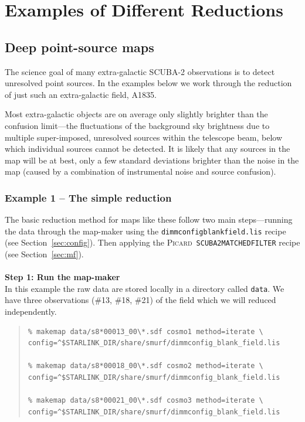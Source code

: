 \documentclass[twoside,11pt]{article}
\newcommand{\htmlref}[2]{#1}
\newcommand{\latexhtml}[2]{#1}
\newcommand{\xref}[3]{#1}
\newcommand{\xlabel}[1]{}
\renewcommand{\_}{\texttt{\symbol{95}}}
\newenvironment{myquote}{
   \color{MidnightBlue}\begin{quote}\begin{small}}{
   \end{small}\end{quote}
}
\newcommand{\picard}{\xref{\textsc{Picard}}{sun265}{}}
\newcommand{\drrecipe}[1]{\texttt{#1}}
\newcommand{\file}[1]{\texttt{#1}}
\newcommand{\cref}[3]{\latexhtml{#1~\ref{#2}}{\htmlref{#3}{#2}}}
\renewenvironment{myquote}{
      \begin{quote}\begin{small}}{
      \end{small}\end{quote}
   }
\begin{document}
\clearpage
\section{\xlabel{Examples}Examples of Different Reductions}
\label{sec:eg}

\subsection{\xlabel{Cosmology}Deep point-source maps}
\label{sec:cosmology}

The science goal of many extra-galactic SCUBA-2 observations is to
detect unresolved point sources. In the examples below we work through the
reduction of just such an extra-galactic field, A1835.

Most extra-galactic objects are on average only slightly brighter than
the confusion limit---the fluctuations of the background sky
brightness due to multiple super-imposed, unresolved sources within
the telescope beam, below which individual sources cannot be detected.
It is likely that any sources in the map will be at best, only a few
standard deviations brighter than the noise in the map (caused by a
combination of instrumental noise and source confusion).

\subsubsection{Example 1 -- The simple reduction}
The basic reduction method for maps like these follow two main
steps---running the data through the map-maker using the
\file{dimmconfig\_blank\_field.lis} recipe (see
\cref{Section}{sec:config}{Specialised configuration files}). Then
applying the \picard\ \drrecipe{SCUBA2\_MATCHED\_FILTER} recipe (see
\cref{Section}{sec:mf}{Point-source extraction}).
\\ \\
\textbf{Step 1: Run the map-maker}\\
In this example the raw data are stored locally in a directory called
\file{data}. We have three observations (\#13, \#18, \#21) of the field
which we will reduced independently.

\begin{myquote}
\begin{verbatim}
% makemap data/s8*00013_00\*.sdf cosmo1 method=iterate \
config=^$STARLINK_DIR/share/smurf/dimmconfig_blank_field.lis

% makemap data/s8*00018_00\*.sdf cosmo2 method=iterate \
config=^$STARLINK_DIR/share/smurf/dimmconfig_blank_field.lis

% makemap data/s8*00021_00\*.sdf cosmo3 method=iterate \
config=^$STARLINK_DIR/share/smurf/dimmconfig_blank_field.lis

\end{verbatim}
\end{myquote}
\end{document}
